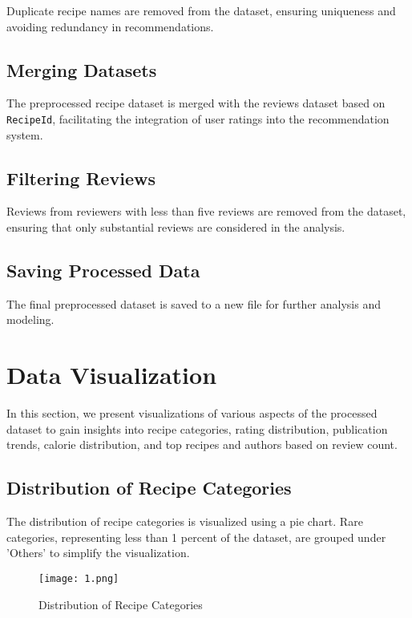 \documentclass[conference]{IEEEtran}
\begin{document}
Duplicate recipe names are removed from the dataset, ensuring uniqueness and avoiding redundancy in recommendations.

\subsection{Merging Datasets}

The preprocessed recipe dataset is merged with the reviews dataset based on \texttt{RecipeId}, facilitating the integration of user ratings into the recommendation system.

\subsection{Filtering Reviews}

Reviews from reviewers with less than five reviews are removed from the dataset, ensuring that only substantial reviews are considered in the analysis.

\subsection{Saving Processed Data}

The final preprocessed dataset is saved to a new file for further analysis and modeling.

\section{Data Visualization}

In this section, we present visualizations of various aspects of the processed dataset to gain insights into recipe categories, rating distribution, publication trends, calorie distribution, and top recipes and authors based on review count.

\subsection{Distribution of Recipe Categories}

The distribution of recipe categories is visualized using a pie chart. Rare categories, representing less than 1 percent of the dataset, are grouped under 'Others' to simplify the visualization.

\begin{figure}[H]
\centering
\texttt{[image: 1.png]}
\caption{Distribution of Recipe Categories}
\label{fig:distribution_categories}
\end{figure}
\end{document}
